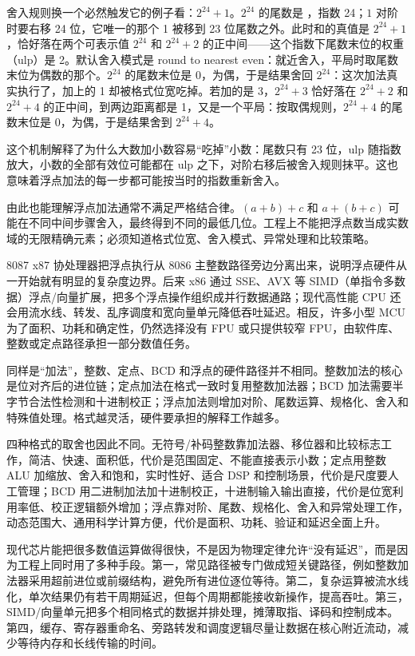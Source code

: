 舍入规则换一个必然触发它的例子看：$2^{24} + 1$。$2^{24}$ 的尾数是 ，指数 24；$1$ 对阶时要右移 24 位，它唯一的那个 1 被移到 23 位尾数之外。此时和的真值是 $2^{24} + 1$，恰好落在两个可表示值 $2^{24}$ 和 $2^{24} + 2$ 的正中间——这个指数下尾数末位的权重（ulp）是 2。默认舍入模式是 round to nearest even：就近舍入，平局时取尾数末位为偶数的那个。$2^{24}$ 的尾数末位是 0，为偶，于是结果舍回 $2^{24}$：这次加法真实执行了，加上的 1 却被格式位宽吃掉。若加的是 3，$2^{24} + 3$ 恰好落在 $2^{24} + 2$ 和 $2^{24} + 4$ 的正中间，到两边距离都是 1，又是一个平局：按取偶规则，$2^{24} + 4$ 的尾数末位是 0，为偶，于是结果舍到 $2^{24} + 4$。

这个机制解释了为什么大数加小数容易“吃掉”小数：尾数只有 23 位，ulp 随指数放大，小数的全部有效位可能都在 ulp 之下，对阶右移后被舍入规则抹平。这也意味着浮点加法的每一步都可能按当时的指数重新舍入。

由此也能理解浮点加法通常不满足严格结合律。$(a+b)+c$ 和 $a+(b+c)$ 可能在不同中间步骤舍入，最终得到不同的最低几位。工程上不能把浮点数当成实数域的无限精确元素；必须知道格式位宽、舍入模式、异常处理和比较策略。

\begin{chipcase}
8087 x87 协处理器把浮点执行从 8086 主整数路径旁边分离出来，说明浮点硬件从一开始就有明显的复杂度边界。后来 x86 通过 SSE、AVX 等 SIMD（单指令多数据）浮点/向量扩展，把多个浮点操作组织成并行数据通路；现代高性能 CPU 还会用流水线、转发、乱序调度和宽向量单元降低吞吐延迟。相反，许多小型 MCU 为了面积、功耗和确定性，仍然选择没有 FPU 或只提供较窄 FPU，由软件库、整数或定点路径承担一部分数值任务。
\end{chipcase}

同样是“加法”，整数、定点、BCD 和浮点的硬件路径并不相同。整数加法的核心是位对齐后的进位链；定点加法在格式一致时复用整数加法器；BCD 加法需要半字节合法性检测和十进制校正；浮点加法则增加对阶、尾数运算、规格化、舍入和特殊值处理。格式越灵活，硬件要承担的解释工作越多。

四种格式的取舍也因此不同。无符号/补码整数靠加法器、移位器和比较标志工作，简洁、快速、面积低，代价是范围固定、不能直接表示小数；定点用整数 ALU 加缩放、舍入和饱和，实时性好、适合 DSP 和控制场景，代价是尺度要人工管理；BCD 用二进制加法加十进制校正，十进制输入输出直接，代价是位宽利用率低、校正逻辑额外增加；浮点靠对阶、尾数、规格化、舍入和异常处理工作，动态范围大、通用科学计算方便，代价是面积、功耗、验证和延迟全面上升。

现代芯片能把很多数值运算做得很快，不是因为物理定律允许“没有延迟”，而是因为工程上同时用了多种手段。第一，常见路径被专门做成短关键路径，例如整数加法器采用超前进位或前缀结构，避免所有进位逐位等待。第二，复杂运算被流水线化，单次结果仍有若干周期延迟，但每个周期都能接收新操作，提高吞吐。第三，SIMD/向量单元把多个相同格式的数据并排处理，摊薄取指、译码和控制成本。第四，缓存、寄存器重命名、旁路转发和调度逻辑尽量让数据在核心附近流动，减少等待内存和长线传输的时间。

